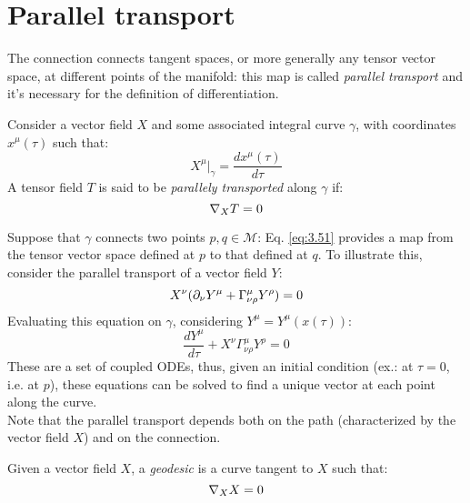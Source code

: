 \section{Parallel transport}

The connection connects tangent spaces, or more generally any tensor vector space, at different points of the manifold: this map is called \textit{parallel transport} and it's necessary for the definition of differentiation.

\begin{definition}
  Consider a vector field $ X $ and some associated integral curve $ \gamma $, with coordinates $ x^\mu(\tau) $ such that:
  \begin{equation*}
    X^\mu \big\vert_\gamma = \frac{dx^\mu(\tau)}{d\tau}
  \end{equation*}
  A tensor field $ T $ is said to be \textit{parallely transported} along $ \gamma $ if:
  \begin{equation}
    \nabla_X T = 0
    \label{eq:3.51}
  \end{equation}
\end{definition}

Suppose that $ \gamma $ connects two points $ p,q \in \mathcal{M} $: Eq. \ref{eq:3.51} provides a map from the tensor vector space defined at $ p $ to that defined at $ q $. To illustrate this, consider the parallel transport of a vector field $ Y $:
\begin{equation*}
  X^\nu (\partial_\nu Y^\mu + \Gamma^\mu_{\nu \rho} Y^\rho) = 0
\end{equation*}
Evaluating this equation on $ \gamma $, considering $ Y^\mu = Y^\mu(x(\tau)) $:
\begin{equation*}
  \frac{dY^\mu}{d\tau} + X^\nu \Gamma^\mu_{\nu \rho} Y^\rho = 0
\end{equation*}
These are a set of coupled ODEs, thus, given an initial condition (ex.: at $ \tau = 0 $, i.e. at $ p $), these equations can be solved to find a unique vector at each point along the curve.\\
Note that the parallel transport depends both on the path (characterized by the vector field $ X $) and on the connection.

\begin{definition}
  Given a vector field $ X $, a \textit{geodesic} is a curve tangent to $ X $ such that:
  \begin{equation}
    \nabla_X X = 0
    \label{eq:3.52}
  \end{equation}
\end{definition}

